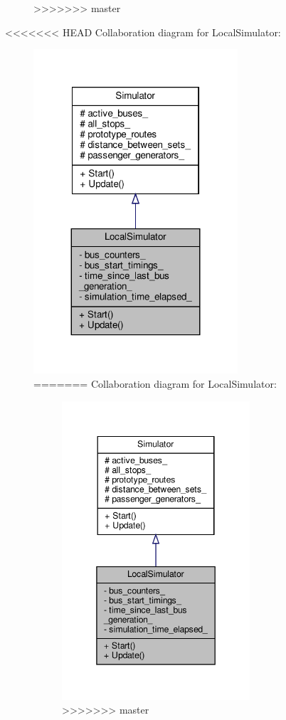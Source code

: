 \begin{figure}[H]
\begin{center}
\begin{figure}[H]
\begin{center}
>>>>>>> master
\end{center}
\end{figure}


<<<<<<< HEAD
Collaboration diagram for Local\+Simulator\+:\nopagebreak
\begin{figure}[H]
\begin{center}
\leavevmode
\includegraphics[width=215pt]{classLocalSimulator__coll__graph}
=======
Collaboration diagram for Local\+Simulator\+:
\nopagebreak
\begin{figure}[H]
\begin{center}
\leavevmode
\includegraphics[width=213pt]{classLocalSimulator__coll__graph}
>>>>>>> master
\end{center}
\end{figure}

\end{center}
\end{figure}
\end{center}
\end{figure}
